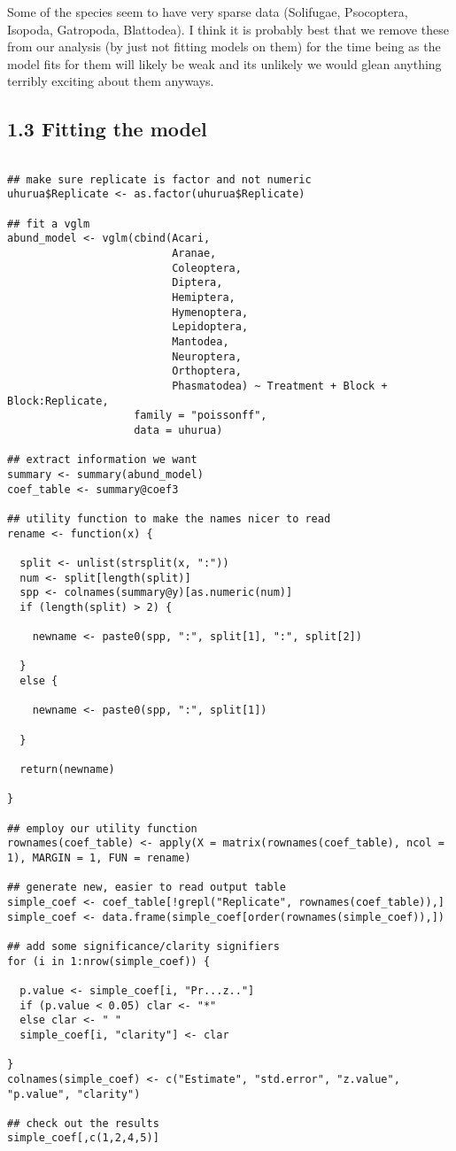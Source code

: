 \documentclass[11pt]{article}
\begin{document}
Some of the species seem to have very sparse data (Solifugae, Psocoptera, Isopoda, Gatropoda, Blattodea). I think it is probably best that we remove these from our analysis (by just not fitting models on them) for the time being as the model fits for them will likely be weak and its unlikely we would glean anything terribly exciting about them anyways.

\subsection*{1.3 Fitting the model}
\label{sec:orgb6e5efa}

\begin{verbatim}

## make sure replicate is factor and not numeric
uhurua$Replicate <- as.factor(uhurua$Replicate)

## fit a vglm
abund_model <- vglm(cbind(Acari,
                          Aranae,
                          Coleoptera,
                          Diptera,
                          Hemiptera,
                          Hymenoptera,
                          Lepidoptera,
                          Mantodea,
                          Neuroptera,
                          Orthoptera,
                          Phasmatodea) ~ Treatment + Block + Block:Replicate,
                    family = "poissonff",
                    data = uhurua)

## extract information we want
summary <- summary(abund_model)
coef_table <- summary@coef3

## utility function to make the names nicer to read
rename <- function(x) {

  split <- unlist(strsplit(x, ":"))
  num <- split[length(split)]
  spp <- colnames(summary@y)[as.numeric(num)]
  if (length(split) > 2) {

    newname <- paste0(spp, ":", split[1], ":", split[2])

  }
  else {

    newname <- paste0(spp, ":", split[1])

  }

  return(newname)

}

## employ our utility function
rownames(coef_table) <- apply(X = matrix(rownames(coef_table), ncol = 1), MARGIN = 1, FUN = rename)

## generate new, easier to read output table
simple_coef <- coef_table[!grepl("Replicate", rownames(coef_table)),]
simple_coef <- data.frame(simple_coef[order(rownames(simple_coef)),])

## add some significance/clarity signifiers
for (i in 1:nrow(simple_coef)) {

  p.value <- simple_coef[i, "Pr...z.."]
  if (p.value < 0.05) clar <- "*"
  else clar <- " "
  simple_coef[i, "clarity"] <- clar

}
colnames(simple_coef) <- c("Estimate", "std.error", "z.value", "p.value", "clarity")

## check out the results
simple_coef[,c(1,2,4,5)]

\end{verbatim}
\end{document}
